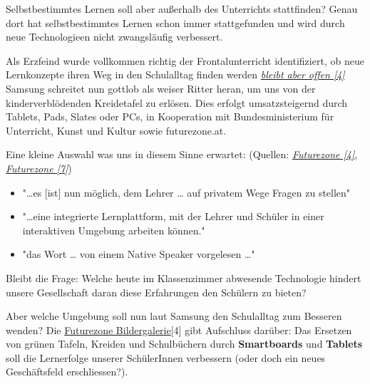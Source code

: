 \documentclass[10pt,a4paper,ngerman,twoside]{article} %
\begin{document}
\begin{multicols}{3}
Selbstbestimmtes Lernen soll aber außerhalb des Unterrichts stattfinden? Genau dort hat selbstbestimmtes Lernen schon immer stattgefunden und wird durch neue Technologieen nicht zwangsläufig verbessert.

Als Erzfeind wurde vollkommen richtig der Frontalunterricht identifiziert, ob neue Lernkonzepte ihren Weg in den Schulalltag finden werden \href{http://futurezone.at/digitallife/14938-gesucht-die-smarte-schule-von-morgen.php}{\textit{bleibt aber offen [4]}}
Samsung schreitet nun gottlob als weiser Ritter heran, um uns von der kinderverblödenden Kreidetafel zu erlösen. Dies erfolgt umsatzsteigernd durch Tablets, Pads, Slates oder PCs, in Kooperation mit Bundesministerium für Unterricht, Kunst und Kultur sowie futurezone.at.

Eine kleine Auswahl was uns in diesem Sinne erwartet: (Quellen: \href{http://futurezone.at/digitallife/14938-gesucht-die-smarte-schule-von-morgen.php}{\textit{Futurezone [4]}},
\href{http://futurezone.at/digitallife/14960-tablet-und-pc-klassen-als-vorzeigeprojekte.php}{\textit{Futurezone [7]}})


\begin{itemize}
  \item "…es [ist] nun möglich, dem Lehrer … auf privatem Wege Fragen zu stellen"
  \item "…eine integrierte Lernplattform, mit der Lehrer und Schüler in einer interaktiven Umgebung arbeiten können."
  \item "das Wort … von einem Native Speaker vorgelesen …"
\end{itemize}

Bleibt die Frage: Welche heute im Klassenzimmer abwesende Technologie hindert unsere Gesellschaft daran diese Erfahrungen den Schülern zu bieten?

Aber welche Umgebung soll nun laut Samsung den Schulalltag zum Besseren wenden?
Die \href{http://futurezone.at/digitallife/14938-gesucht-die-smarte-schule-von-morgen.php}{Futurezone  Bildergalerie}[4] gibt Aufschluss darüber: Das Ersetzen von grünen Tafeln, Kreiden und Schulbüchern durch \textbf{Smartboards} und \textbf{Tablets} soll die Lernerfolge unserer SchülerInnen verbessern (oder doch ein neues Geschäftsfeld erschliessen?).


\end{multicols}
\end{document}
